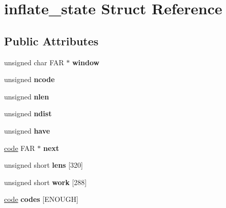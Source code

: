 \hypertarget{structinflate__state}{}\section{inflate\+\_\+state Struct Reference}
\label{structinflate__state}
\subsection*{Public Attributes}
\begin{DoxyCompactItemize}
\item 
\mbox{\label{structinflate__state_a35b5915bbe6b94f773d9eab51fa8f633}} 
unsigned char F\+AR $\ast$ {\bfseries window}
\item 
\mbox{\label{structinflate__state_a62b5ea8559856b315b6c89d9114c2109}} 
unsigned {\bfseries ncode}
\item 
\mbox{\label{structinflate__state_a489b005f4fe214353cd80b77b4f23194}} 
unsigned {\bfseries nlen}
\item 
\mbox{\label{structinflate__state_a4415e5e51efdd0c8672e4c601caa4762}} 
unsigned {\bfseries ndist}
\item 
\mbox{\label{structinflate__state_a4a2b15912256bcf7b39980e15095ba58}} 
unsigned {\bfseries have}
\item 
\mbox{\label{structinflate__state_a732fb4f62e27dc5dd3f35076575ba450}} 
\hyperlink{structcode}{code} F\+AR $\ast$ {\bfseries next}
\item 
\mbox{\label{structinflate__state_a331b69d1c6f74c7be5c90ed28e80203b}} 
unsigned short {\bfseries lens} \mbox{[}320\mbox{]}
\item 
\mbox{\label{structinflate__state_a26883e050c93e44f1c45eadfb1ccaa93}} 
unsigned short {\bfseries work} \mbox{[}288\mbox{]}
\item 
\mbox{\label{structinflate__state_af6e7df6bff086c3b9cf2615367949277}} 
\hyperlink{structcode}{code} {\bfseries codes} \mbox{[}E\+N\+O\+U\+GH\mbox{]}

\end{DoxyCompactItemize}
